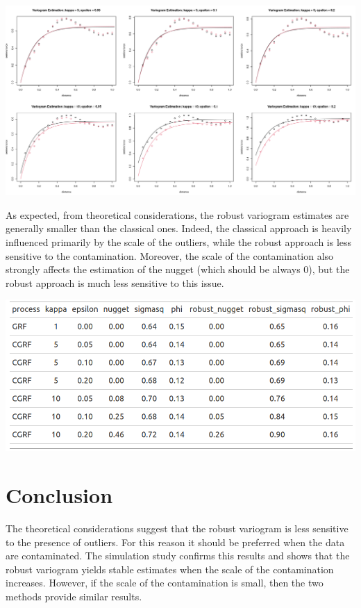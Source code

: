 \documentclass[
  12pt]{article}
\begin{document}
\begin{center}
\includegraphics[width=6.25in,height=\textheight]{img/variog_cgrf_ols.png}
\end{center}

As expected, from theoretical considerations, the robust variogram
estimates are generally smaller than the classical ones. Indeed, the
classical approach is heavily influenced primarily by the scale of the
outliers, while the robust approach is less sensitive to the
contamination. Moreover, the scale of the contamination also strongly
affects the estimation of the nugget (which should be always 0), but the
robust approach is much less sensitive to this issue.

\begin{center}
\includegraphics[width=6.25in,height=\textheight]{img/variog_est_ols.png}
\end{center}

\section{Conclusion}\label{conclusion}

The theoretical considerations suggest that the robust variogram is less
sensitive to the presence of outliers. For this reason it should be
preferred when the data are contaminated. The simulation study confirms
this results and shows that the robust variogram yields stable estimates
when the scale of the contamination increases. However, if the scale of
the contamination is small, then the two methods provide similar
results.


  
\end{document}
